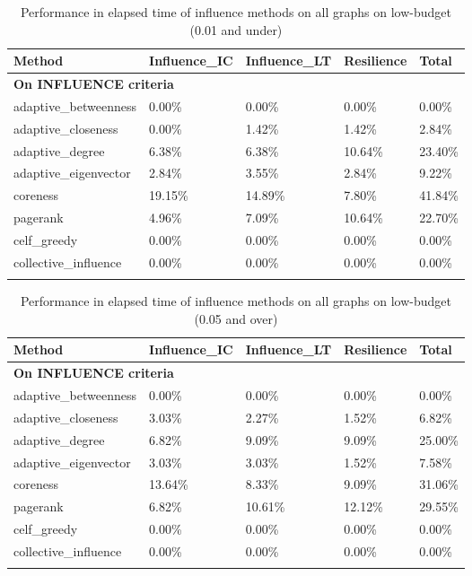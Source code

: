 \begin{longtable}[c]{|l|l|l|l|l|}
	\hline
	\textbf{Method} & \textbf{Influence\_IC} & \textbf{Influence\_LT} & \textbf{Resilience} & \textbf{Total} \\ \hline
	\endfirsthead
	\endhead
	\multicolumn{5}{|l|}{\textbf{On INFLUENCE criteria}}          \\ \hline
	adaptive\_betweenness & 0.00\%  & 0.00\%  & 0.00\%  & 0.00\%  \\ \hline
	adaptive\_closeness   & 0.00\%  & 1.42\%  & 1.42\%  & 2.84\%  \\ \hline
	adaptive\_degree      & 6.38\%  & 6.38\%  & 10.64\% & 23.40\% \\ \hline
	adaptive\_eigenvector & 2.84\%  & 3.55\%  & 2.84\%  & 9.22\%  \\ \hline
	coreness              & 19.15\% & 14.89\% & 7.80\%  & 41.84\% \\ \hline
	pagerank              & 4.96\%  & 7.09\%  & 10.64\% & 22.70\% \\ \hline
	celf\_greedy          & 0.00\%  & 0.00\%  & 0.00\%  & 0.00\%  \\ \hline
	collective\_influence & 0.00\%  & 0.00\%  & 0.00\%  & 0.00\%  \\ \hline
	\caption[IMine performance of influence methods on low budget]{Performance in elapsed time of influence methods on all graphs on low-budget (0.01 and under)}
	\label{tab:inf-fast-min-budget}
\end{longtable}

\begin{longtable}[c]{|l|l|l|l|l|}
	\hline
	\textbf{Method} & \textbf{Influence\_IC} & \textbf{Influence\_LT} & \textbf{Resilience} & \textbf{Total} \\ \hline
	\endfirsthead
	\endhead
	\multicolumn{5}{|l|}{\textbf{On INFLUENCE criteria}}          \\ \hline
	adaptive\_betweenness & 0.00\%  & 0.00\%  & 0.00\%  & 0.00\%  \\ \hline
	adaptive\_closeness   & 3.03\%  & 2.27\%  & 1.52\%  & 6.82\%  \\ \hline
	adaptive\_degree      & 6.82\%  & 9.09\%  & 9.09\%  & 25.00\% \\ \hline
	adaptive\_eigenvector & 3.03\%  & 3.03\%  & 1.52\%  & 7.58\%  \\ \hline
	coreness              & 13.64\% & 8.33\%  & 9.09\%  & 31.06\% \\ \hline
	pagerank              & 6.82\%  & 10.61\% & 12.12\% & 29.55\% \\ \hline
	celf\_greedy          & 0.00\%  & 0.00\%  & 0.00\%  & 0.00\%  \\ \hline
	collective\_influence & 0.00\%  & 0.00\%  & 0.00\%  & 0.00\%  \\ \hline
	\caption[IMine performance of influence methods on high budget]{Performance in elapsed time of influence methods on all graphs on low-budget (0.05 and over)}
	\label{tab:inf-fast-max-budget}
\end{longtable}

